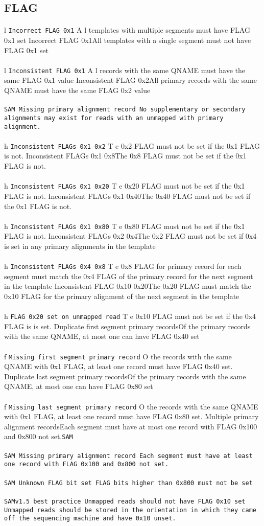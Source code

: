 \documentclass[10pt]{article}
\newcommand{\samrule}{\tt SAM}
\newcommand{\vonefivebestpractice}{\tt SAMv1.5 best practice}
\newcommand{\samstrictrule}[3]{
	\paragraph{} #3
	{\tt #1}
	#2
}
\begin{document}
\subsection{FLAG}
\samstrictrule{Incorrect FLAG 0x1}{All templates with multiple segments must have FLAG 0x1 set}
\samstrictrule{Incorrect FLAG 0x1}{All templates with a single segment must not have FLAG 0x1 set}
\samstrictrule{Inconsistent FLAG 0x1}{All records with the same QNAME must have the same FLAG 0x1 value}
\samstrictrule{Inconsistent FLAG 0x2}{All primary records with the same QNAME must have the same FLAG 0x2 value}
\samstrictrule{Missing primary alignment record}{No supplementary or secondary alignments may exist for reads with an unmapped with primary alignment.}{\samrule}
\samstrictrule{Inconsistent FLAGs 0x1 0x2}{The 0x2 FLAG must not be set if the 0x1 FLAG is not.}
\samstrictrule{Inconsistent FLAGs 0x1 0x8}{The 0x8 FLAG must not be set if the 0x1 FLAG is not.}
\samstrictrule{Inconsistent FLAGs 0x1 0x20}{The 0x20 FLAG must not be set if the 0x1 FLAG is not.}
\samstrictrule{Inconsistent FLAGs 0x1 0x40}{The 0x40 FLAG must not be set if the 0x1 FLAG is not.}
\samstrictrule{Inconsistent FLAGs 0x1 0x80}{The 0x80 FLAG must not be set if the 0x1 FLAG is not.}
\samstrictrule{Inconsistent FLAGs 0x2 0x4}{The 0x2 FLAG must not be set if 0x4 is set in any primary alignments in the template}
\samstrictrule{Inconsistent FLAGs 0x4 0x8}{The 0x8 FLAG for primary record for each segment must match the 0x4 FLAG of the primary record for the next segment in the template}
\samstrictrule{Inconsistent FLAG 0x10 0x20}{The 0x20 FLAG must match the 0x10 FLAG for the primary alignment of the next segment in the template}
\samstrictrule{FLAG 0x20 set on unmapped read}{The 0x10 FLAG must not be set if the 0x4 FLAG is is set.}
\samstrictrule{Duplicate first segment primary records}{Of the primary records with the same QNAME, at most one can have FLAG 0x40 set}
\samstrictrule{Missing first segment primary record}{Of the records with the same QNAME with 0x1 FLAG, at least one record must have FLAG 0x40 set.}
\samstrictrule{Duplicate last segment primary records}{Of the primary records with the same QNAME, at most one can have FLAG 0x80 set}
\samstrictrule{Missing last segment primary record}{Of the records with the same QNAME with 0x1 FLAG, at least one record must have FLAG 0x80 set.}
\samstrictrule{Multiple primary alignment records}{Each segment must have at most one record with FLAG 0x100 and 0x800 not set.}{\samrule}
\samstrictrule{Missing primary alignment record}{Each segment must have at least one record with FLAG 0x100 and 0x800 not set.}{\samrule}
\samstrictrule{Unknown FLAG bit set}{FLAG bits higher than 0x800 must not be set}{\samrule}
\samstrictrule{Unmapped reads should not have FLAG 0x10 set}{Unmapped reads should be stored in the orientation in which they came off the sequencing machine and have 0x10 unset.}{\vonefivebestpractice}
\end{document}
